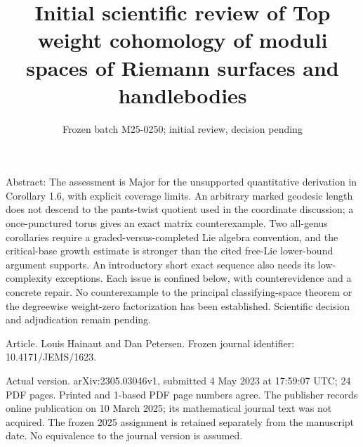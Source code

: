 \documentclass[10pt]{article}
\title{Initial scientific review of
Top weight cohomology of moduli spaces of Riemann surfaces and handlebodies}
\author{}
\date{Frozen batch M25-0250; initial review, decision pending}
\begin{document}
\maketitle
Abstract: The assessment is Major for the unsupported quantitative derivation in Corollary 1.6, with explicit coverage limits. An arbitrary marked geodesic length does not descend to the pants-twist quotient used in the coordinate discussion; a once-punctured torus gives an exact matrix counterexample. Two all-genus corollaries require a graded-versus-completed Lie algebra convention, and the critical-base growth estimate is stronger than the cited free-Lie lower-bound argument supports. An introductory short exact sequence also needs its low-complexity exceptions. Each issue is confined below, with counterevidence and a concrete repair. No counterexample to the principal classifying-space theorem or the degreewise weight-zero factorization has been established. Scientific decision and adjudication remain pending.\par
Article. Louis Hainaut and Dan Petersen. Frozen journal identifier: 10.4171/JEMS/1623.\par
Actual version. arXiv:2305.03046v1, submitted 4 May 2023 at 17:59:07 UTC; 24 PDF pages. Printed and 1-based PDF page numbers agree. The publisher records online publication on 10 March 2025; its mathematical journal text was not acquired. The frozen 2025 assignment is retained separately from the manuscript date. No equivalence to the journal version is assumed.\par
\end{document}
